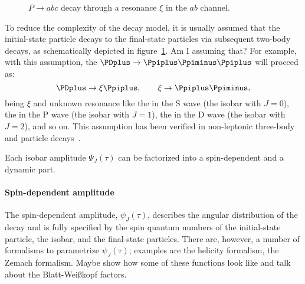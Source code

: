         \begin{figure}
            \centering
            
            \caption{$P\to abc$ decay through a resonance $\xi$ in the $ab$ channel.}
            \label{fig:isobar_three_body_decay}
        \end{figure}
        To reduce the complexity of the decay model, it is usually assumed that the initial-state particle decays to the final-state particles via subsequent two-body decays, as schematically depicted in figure~\ref{fig:isobar_three_body_decay}. {\color{red} Am I assuming that?}
        For example, with this assumption, the $\PDplus \to \Ppiplus\Ppiminus\Ppiplus$ will proceed as:
        \begin{equation*}
            \PDplus\to\xi\Ppiplus,\qquad
            \xi\to\Ppiplus\Ppiminus,
        \end{equation*}
        being $\xi$ and unknown resonance like the \Pfnez{} in the S wave (the isobar with $J=0$), the \Prhozero{} in the P wave (the isobar with $J=1$), the \Pfii{} in the D wave (the isobar with $J=2$), and so on.
        This assumption has been verified in non-leptonic three-body \PD{} and \PB{} particle decays~\cite[\S~13.2]{Bevan:2014iga}.
        
        
        Each isobar amplitude $\Psi_J(\tau)$ can be factorized into a spin-dependent and a dynamic part.

        \paragraph{Spin-dependent amplitude}
        The spin-dependent amplitude, $\psi_J(\tau)$, describes the angular distribution of the decay and is fully specified by the spin quantum numbers of the initial-state particle, the isobar, and the final-state particles.
        There are, however, a number of formalisms to parametrize $\psi_J(\tau)$; examples are the helicity formalism, the Zemach formalism.
        {\color{red} Maybe show how some of these functions look like and talk about the Blatt-Wei\ss{}kopf factors.}


